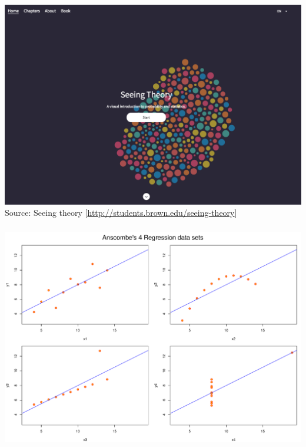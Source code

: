 \documentclass[8pt]{beamer}
\begin{document}

\begin{frame}
\frametitle{\insertsection}
\centering
\includegraphics[width=0.9\linewidth]{seeing_theory}\\
\tiny{Source: Seeing theory [\url{http://students.brown.edu/seeing-theory}]}
\end{frame}


\begin{frame}
\frametitle{\insertsection}
\centering
\includegraphics[width=0.9\linewidth]{anscombe}\\
\end{frame}

\end{document}
